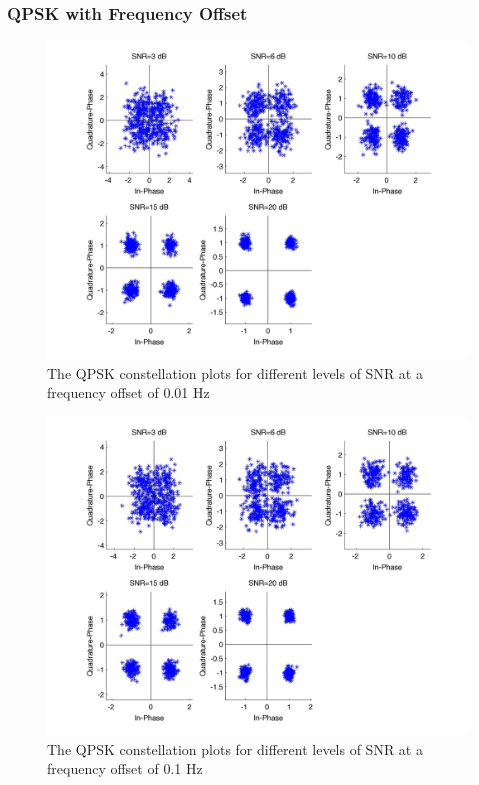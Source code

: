 \documentclass[]{article}
\begin{document}
\subsubsection{QPSK with Frequency Offset}
\begin{figure}[H]
\centering
\hspace*{-2cm}\includegraphics[width=1.3\textwidth]{qpConstfo1.jpg}
\caption{The QPSK constellation plots for different levels of SNR at a frequency offset of 0.01 Hz}
\end{figure}

\begin{figure}[H]
\centering
\hspace*{-2cm}\includegraphics[width=1.3\textwidth]{qpConstfo2.jpg}
\caption{The QPSK constellation plots for different levels of SNR at a frequency offset of 0.1 Hz}
\end{figure}
\end{document}
